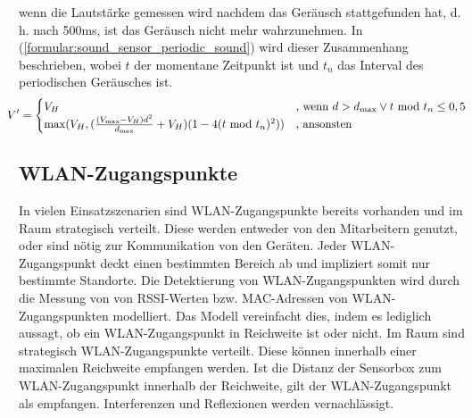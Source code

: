 wenn die Lautstärke gemessen wird nachdem das Geräusch stattgefunden hat,
d. h. nach 500ms, ist das Geräusch nicht mehr wahrzunehmen.
In (\ref{formular:sound_sensor_periodic_sound}) wird dieser Zusammenhang beschrieben,
wobei $t$ der momentane Zeitpunkt ist und $t_{n}$ das Interval des periodischen Geräusches ist.
\begin{align}
    \label{formular:sound_sensor_periodic_sound}
    \hspace{-0.4cm}
    V^{\prime} = \begin{cases}
                     V_H & \text{, wenn } d > d_{\max} \vee t\ \text{mod}\ t_{n}\leq 0,5 \\
                     \max(V_H, (\frac{(V_{\max} - V_H)d^2}{d_{\max}} + V_H)(1 - 4(t\ \text{mod}\ t_{n})^2)) & \text{, ansonsten}
    \end{cases}
\end{align}

\subsection{WLAN-Zugangspunkte}
In vielen Einsatzszenarien sind WLAN-Zugangspunkte bereits vorhanden und im Raum strategisch verteilt.
Diese werden entweder von den Mitarbeitern genutzt, oder sind nötig zur Kommunikation von den Geräten.
Jeder WLAN-Zugangspunkt deckt einen bestimmten Bereich ab und impliziert somit nur bestimmte Standorte.
\newline
\newline
Die Detektierung von WLAN-Zugangspunkten wird durch die Messung von von RSSI-Werten bzw. MAC-Adressen von WLAN-Zugangspunkten modelliert.
Das Modell vereinfacht dies, indem es lediglich aussagt, ob ein WLAN-Zugangspunkt in Reichweite ist oder nicht.
\newline
\newline
Im Raum sind strategisch WLAN-Zugangspunkte verteilt.
Diese können innerhalb einer maximalen Reichweite empfangen werden.
Ist die Distanz der Sensorbox zum WLAN-Zugangspunkt innerhalb der Reichweite, gilt der WLAN-Zugangspunkt als empfangen.
Interferenzen und Reflexionen werden vernachlässigt.